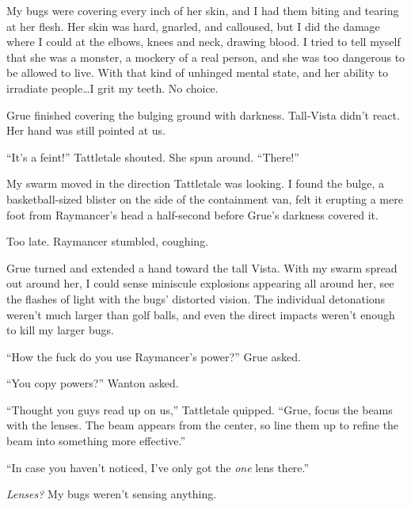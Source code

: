 My bugs were covering every inch of her skin, and I had them biting and tearing at her flesh.  Her skin was hard, gnarled, and calloused, but I did the damage where I could at the elbows, knees and neck, drawing blood.  I tried to tell myself that she was a monster, a mockery of a real person, and she was too dangerous to be allowed to live.  With that kind of unhinged mental state, and her ability to irradiate people\ldots  I grit my teeth.  No choice.



Grue finished covering the bulging ground with darkness.  Tall-Vista didn't react.  Her hand was still pointed at us.



``It's a feint!''  Tattletale shouted.  She spun around.  ``There!''



My swarm moved in the direction Tattletale was looking.  I found the bulge, a basketball-sized blister on the side of the containment van, felt it erupting a mere foot from Raymancer's head a half-second before Grue's darkness covered it.



Too late.  Raymancer stumbled, coughing.



Grue turned and extended a hand toward the tall Vista.  With my swarm spread out around her, I could sense miniscule explosions appearing all around her, see the flashes of light with the bugs' distorted vision.  The individual detonations weren't much larger than golf balls, and even the direct impacts weren't enough to kill my larger bugs.



``How the fuck do you use Raymancer's power?''  Grue asked.



``You copy powers?''  Wanton asked.



``Thought you guys read up on us,'' Tattletale quipped.  ``Grue, focus the beams with the lenses.  The beam appears from the center, so line them up to refine the beam into something more effective.''



``In case you haven't noticed, I've only got the \emph{one} lens there.''



\emph{Lenses?  }My bugs weren't sensing anything.



